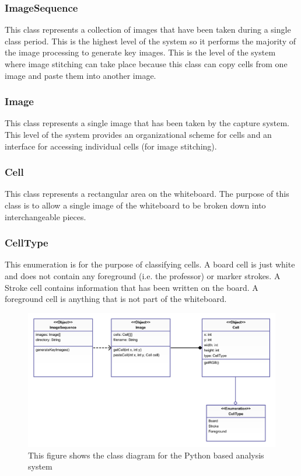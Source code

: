 \documentclass[]{article}
\begin{document}
				\subsubsection{ImageSequence}
					This class represents a collection of images that have been taken during a single class period. This is the highest level of the system so it performs the majority of the image processing to generate key images. This is the level of the system where image stitching can take place because this class can copy cells from one image and paste them into another image. 
					
				\subsubsection{Image}
					This class represents a single image that has been taken by the capture system. This level of the system provides an organizational scheme for cells and an interface for accessing individual cells (for image stitching). 
			
				\subsubsection{Cell}
					This class represents a rectangular area on the whiteboard. The purpose of this class is to allow a single image of the whiteboard to be broken down into interchangeable pieces.
					
				\subsubsection{CellType}
					This enumeration is for the purpose of classifying cells. A board cell is just white and does not contain any foreground (i.e. the professor) or marker strokes. A Stroke cell contains information that has been written on the board. A foreground cell is anything that is not part of the whiteboard.
					
			
			\begin{figure}
				\centering
				\includegraphics[scale=0.5]{images/uml-analysis-system.pdf}
				\caption{This figure shows the class diagram for the Python based analysis system}
				\label{img:uml-analysis-system}
			\end{figure}
			
\end{document}
